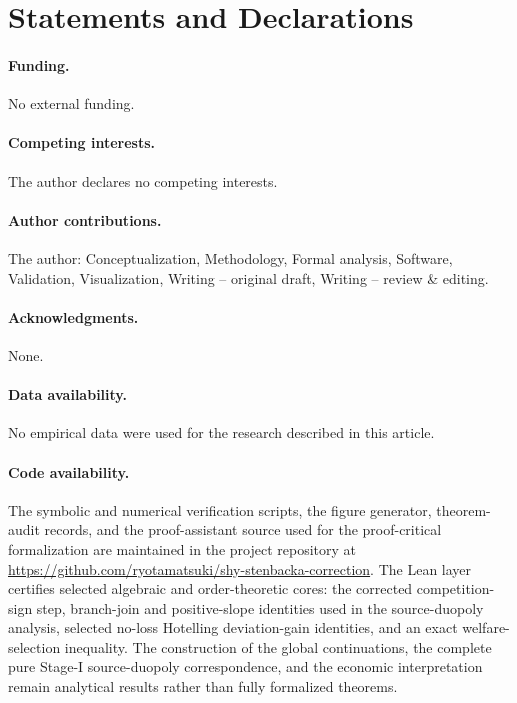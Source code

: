 \section*{Statements and Declarations}

\paragraph{Funding.}
No external funding.

\paragraph{Competing interests.}
The author declares no competing interests.

\paragraph{Author contributions.}
The author: Conceptualization, Methodology, Formal analysis, Software, Validation, Visualization, Writing -- original draft, Writing -- review \& editing.

\paragraph{Acknowledgments.}
None.

\paragraph{Data availability.}
No empirical data were used for the research described in this article.

\paragraph{Code availability.}
The symbolic and numerical verification scripts, the figure generator, theorem-audit records, and the proof-assistant source used for the proof-critical formalization are maintained in the project repository at
\url{https://github.com/ryotamatsuki/shy-stenbacka-correction}.
The Lean layer certifies selected algebraic and order-theoretic cores: the corrected competition-sign step, branch-join and positive-slope identities used in the source-duopoly analysis, selected no-loss Hotelling deviation-gain identities, and an exact welfare-selection inequality. The construction of the global continuations, the complete pure Stage-I source-duopoly correspondence, and the economic interpretation remain analytical results rather than fully formalized theorems.

